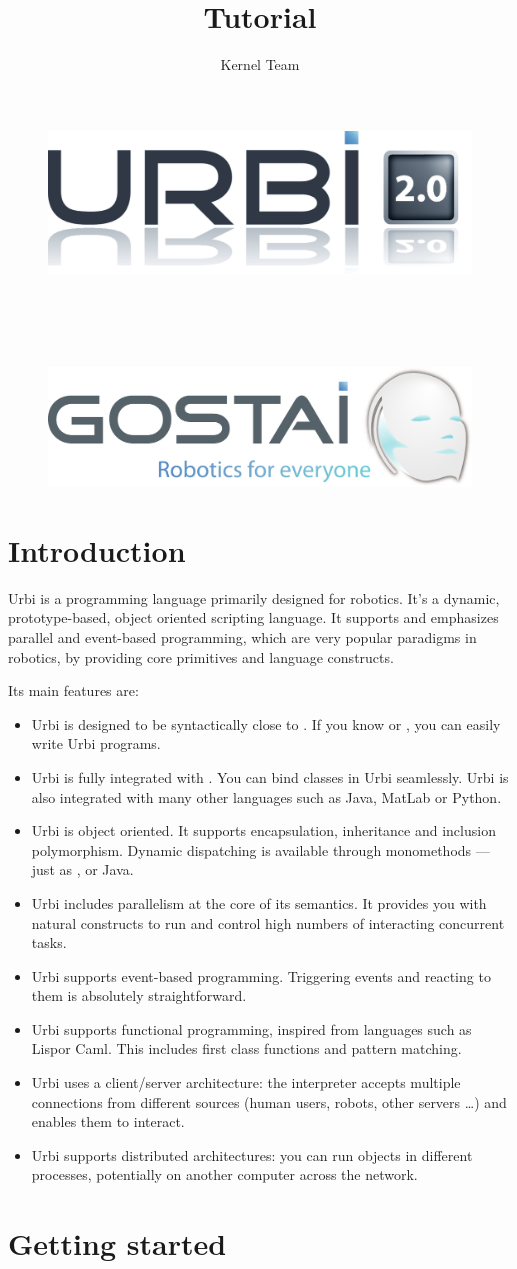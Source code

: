\documentclass[openright,twoside,12pt]{report}
\title{Tutorial}
\author{Kernel Team}
\makeatletter
\newcommand{\caml}{Caml\xspace}
\newcommand{\java}{Java\xspace}
\newcommand{\lisp}{Lisp}
\newcommand{\matlab}{MatLab\xspace}
\newcommand{\python}{Python\xspace}
\newcommand{\urbi}{Urbi\xspace}
\renewcommand{\maketitle}{
  \begin{titlepage}

    \vfill

    \begin{figure}[htp]
      \centering
      \includegraphics[width=12cm]{img/urbi-logo}
    \end{figure}

    \begin{center}
      {\Huge\bf\@title\\}
      \vspace{1cm}
      {\Large \@author\\}
      \vspace{1cm}
      {\large \@date\\}
    \end{center}

    \vfill

    \begin{figure}[htp]
      \centering
      \includegraphics[width=12cm]{img/gostai}
    \end{figure}

    \vfill
    \global\let\title\relax
  \end{titlepage}
}
\makeatother
\begin{document}
\maketitle
\tableofcontents
\chapter{Introduction}

Urbi is a programming language primarily designed for robotics. It's a
dynamic, prototype-based, object oriented scripting language. It
supports and emphasizes parallel and event-based programming, which
are very popular paradigms in robotics, by providing core primitives
and language constructs.

Its main features are:
\begin{itemize}
\item \urbi is designed to be syntactically close to \Cxx. If you know
  \C or \Cxx, you can easily write \urbi programs.
\item \urbi is fully integrated with \Cxx. You can bind \Cxx classes
  in \urbi seamlessly. \urbi is also integrated with many other
  languages such as \java, \matlab or \python.
\item \urbi is object oriented. It supports encapsulation, inheritance
  and inclusion polymorphism. Dynamic dispatching is available through
  monomethods --- just as \Cxx, \Cs or \java.
\item \urbi includes parallelism at the core of its semantics. It
  provides you with natural constructs to run and control high numbers
  of interacting concurrent tasks.
\item \urbi supports event-based programming. Triggering events and
  reacting to them is absolutely straightforward.
\item \urbi supports functional programming, inspired from languages
  such as \lisp or \caml. This includes first class functions and
  pattern matching.
\item \urbi uses a client/server architecture: the interpreter accepts
  multiple connections from different sources (human users, robots,
  other servers \ldots) and enables them to interact.
\item \urbi supports distributed architectures: you can run objects in
  different processes, potentially on another computer across the
  network.
\end{itemize}

\chapter{Getting started}
\end{document}
